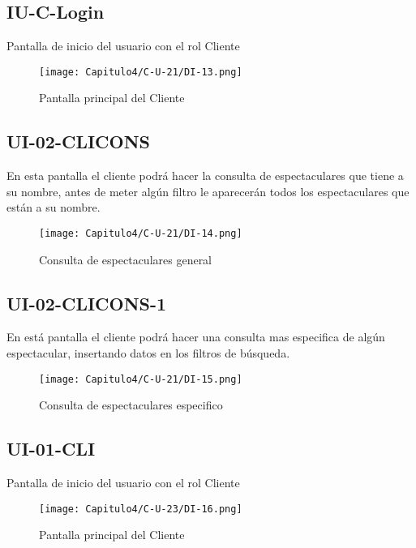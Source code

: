 \hypertarget{IU:IU-C-Login}{}
\subsection{IU-C-Login}
Pantalla de inicio del usuario con el rol Cliente
\begin{figure}[htbp!]
\centering
    \texttt{[image: Capitulo4/C-U-21/DI-13.png]}
    \caption{Pantalla principal del Cliente}
    \label{fig:my_label}
\end{figure}
\clearpage



\subsection{UI-02-CLICONS}
En esta pantalla el cliente podrá hacer la consulta de espectaculares que tiene a su nombre, antes de meter algún filtro le aparecerán todos los espectaculares que están a su nombre.
\begin{figure}[htbp!]
\centering
    \texttt{[image: Capitulo4/C-U-21/DI-14.png]}
    \caption{Consulta de espectaculares general}
    \label{fig:my_label}
\end{figure}
\clearpage



\subsection{UI-02-CLICONS-1}
En está pantalla el cliente podrá hacer una consulta mas especifica de algún espectacular, insertando datos en los filtros de búsqueda.
\begin{figure}[htbp!]
\centering
    \texttt{[image: Capitulo4/C-U-21/DI-15.png]}
    \caption{Consulta de espectaculares especifico}
    \label{fig:my_label}
\end{figure}
\clearpage



\subsection{UI-01-CLI}
Pantalla de inicio del usuario con el rol Cliente
\begin{figure}[htbp!]
\centering
    \texttt{[image: Capitulo4/C-U-23/DI-16.png]}
    \caption{Pantalla principal del Cliente}
    \label{fig:my_label}
\end{figure}
\clearpage



